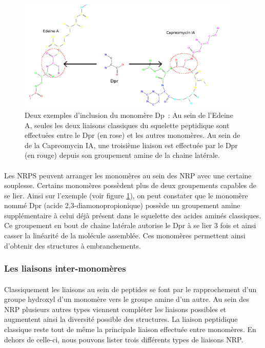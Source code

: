 \documentclass[12pt,french,twoside]{report}
\begin{document}
\begin{figure}[h!]
  \begin{center}
    \includegraphics[width=400px]{Figures/bio/Intro/Dpr/2-3_liaisons.png}
    \caption{\label{DPR_incl}Deux exemples d'inclusion du monomère Dp~:
    Au sein de l'Edeine A, seules les deux liaisons classiques du squelette peptidique sont effectuées entre le Dpr (en rose) et les autres monomères.
    Au sein de de la Capreomycin IA, une troisième liaison est effectuée par le Dpr (en rouge) depuis son groupement amine de la chaine latérale.}
  \end{center}
\end{figure}

\paragraph{}Les NRPS peuvent arranger les monomères au sein des NRP avec une certaine souplesse.
Certains monomères possèdent plus de deux groupements capables de se lier.
Ainsi sur l'exemple (voir figure \ref{DPR_incl}), on peut constater que le monomère nommé Dpr (acide 2,3-diamonopropionique) possède un groupement amine supplémentaire à celui déjà présent dans le squelette des acides aminés classiques.
Ce groupement en bout de chaine latérale autorise le Dpr à se lier 3 fois et ainsi casser la linéarité de la molécule assemblée.
Ces monomères permettent ainsi d'obtenir des structures à embranchements.


\subsubsection{Les liaisons inter-monomères}

\paragraph{}Classiquement les liaisons au sein de peptides se font par le rapprochement d'un groupe hydroxyl d'un monomère vers le groupe amine d'un autre.
Au sein des NRP plusieurs autres types viennent compléter les liaisons possibles et augmentent ainsi la diversité possible des structures.
La liaison peptidique classique reste tout de même la principale liaison effectuée entre monomères.
En dehors de celle-ci, nous pouvons lister trois différents types de liaisons NRP.
\end{document}
